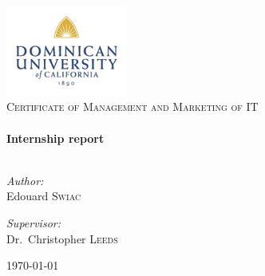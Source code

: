\begin{titlepage}

\begin{center}


\includegraphics[width=0.30\textwidth]{./dominican}
\\[1cm]

\textsc{Certificate of Management and Marketing of IT}
\\[1.5cm]


\HRule
\\[0.4cm]
{ \huge \bfseries Internship report}
\\[0.4cm]

\HRule 
\\[1.5cm]

\begin{minipage}{0.4\textwidth}
\begin{flushleft} \large
\emph{Author:}\\
Edouard \textsc{Swiac}
\end{flushleft}
\end{minipage}
\begin{minipage}{0.4\textwidth}
\begin{flushright} \large
\emph{Supervisor:} \\
Dr.~Christopher \textsc{Leeds}
\end{flushright}
\end{minipage}

\vfill

{\large \today}

\end{center}

\end{titlepage}